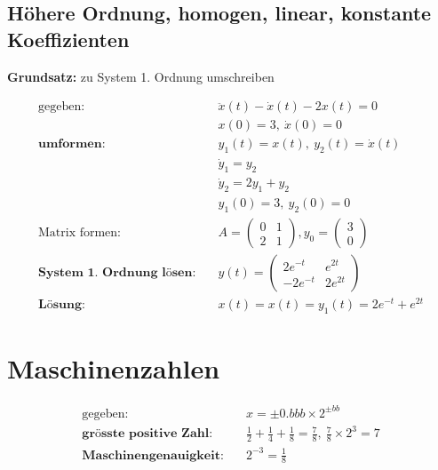 \documentclass[11pt]{article}
\begin{document}
\subsection{H{\"o}here Ordnung, homogen, linear, konstante Koeffizienten}

\begin{center}
	\textbf{Grundsatz:} zu System 1. Ordnung umschreiben
\end{center}

\begin{equation*}
\begin{split}
	\text{gegeben:}\quad & \ddot x(t) - \dot x(t) -2x(t) = 0 \\
	& x(0) = 3,\ \dot x(0) = 0 \\
	\textbf{umformen:}\quad & y_1(t) = x(t),\ y_2(t) = \dot x(t) \\
	& \dot y_1 = y_2 \\
	& \dot y_2 = 2y_1 + y_2 \\
	& y_1(0) = 3,\ y_2(0) = 0 \\
	\text{Matrix formen:}\quad & A = \begin{pmatrix}
		0 & 1 \\ 2 & 1
	\end{pmatrix}, y_0 = \begin{pmatrix}
		3 \\ 0
	\end{pmatrix} \\
	\textbf{System 1. Ordnung l{\"o}sen:}\quad & y(t) = \begin{pmatrix}
		2e^{-t} & e^{2t} \\ -2e^{-t} & 2e^{2t}
	\end{pmatrix} \\
	\textbf{L{\"o}sung:} \quad & x(t) = x(t) = y_1(t) = 2e^{-t} + e^{2t}
\end{split}
\end{equation*}

\section{Maschinenzahlen}

\begin{equation*}
\begin{split}
	\text{gegeben:} \quad & x = \pm 0.bbb \times 2^{\pm bb} \\
	\textbf{gr{\"o}sste positive Zahl:} \quad & \frac{1}{2}+\frac{1}{4}+\frac{1}{8} = \frac{7}{8},\ \frac{7}{8} \times 2^3 = 7 \\
	\textbf{Maschinengenauigkeit:} \quad & 2^{-3} = \frac{1}{8} \\
\end{split}
\end{equation*}
\end{document}
